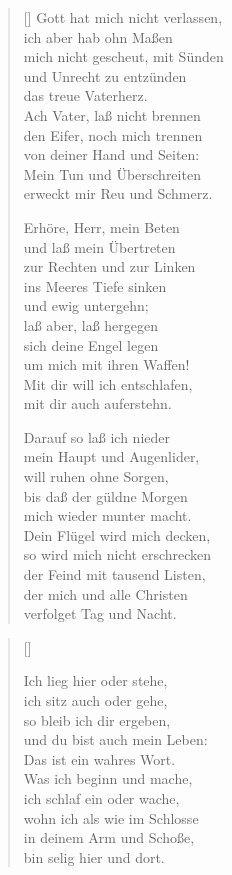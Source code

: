 \begin{multicols}{2}
\begin{verse}[\versewidth]
 Gott hat mich nicht verlassen,\\
ich aber hab ohn Maßen\\
mich nicht gescheut, mit Sünden\\
und Unrecht zu entzünden\\
das treue Vaterherz.\\
Ach Vater, laß nicht brennen\\
den Eifer, noch mich trennen\\
von deiner Hand und Seiten:\\
Mein Tun und Überschreiten\\
erweckt mir Reu und Schmerz.

 Erhöre, Herr, mein Beten\\
und laß mein Übertreten\\
zur Rechten und zur Linken\\
ins Meeres Tiefe sinken\\
und ewig untergehn;\\
laß aber, laß hergegen\\
sich deine Engel legen\\
um mich mit ihren Waffen!\\
Mit dir will ich entschlafen,\\
mit dir auch auferstehn.

 Darauf so laß ich nieder\\
mein Haupt und Augenlider,\\
will ruhen ohne Sorgen,\\
bis daß der güldne Morgen\\
mich wieder munter macht.\\
Dein Flügel wird mich decken,\\
so wird mich nicht erschrecken\\
der Feind mit tausend Listen,\\
der mich und alle Christen\\
verfolget Tag und Nacht.

\end{verse}
\end{multicols}

\begin{center}
\settowidth{\versewidth}{Der, vor dem die Welt erschrickt,}
\begin{verse}[\versewidth]

 Ich lieg hier oder stehe,\\
ich sitz auch oder gehe,\\
so bleib ich dir ergeben,\\
und du bist auch mein Leben:\\
Das ist ein wahres Wort.\\
Was ich beginn und mache,\\
ich schlaf ein oder wache,\\
wohn ich als wie im Schlosse\\
in deinem Arm und Schoße,\\
bin selig hier und dort.
  
\end{verse}
\end{center}


